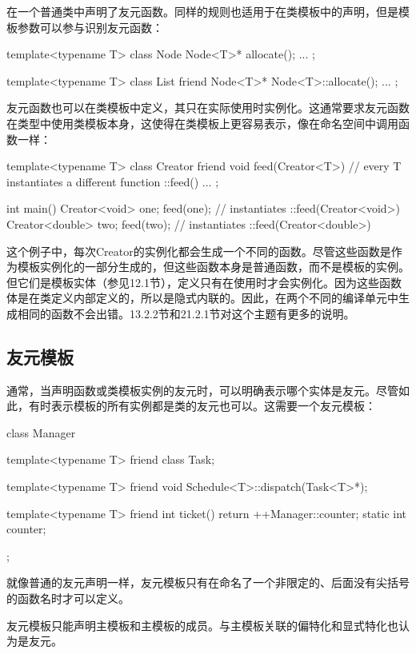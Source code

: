 在一个普通类中声明了友元函数。同样的规则也适用于在类模板中的声明，但是模板参数可以参与识别友元函数：

\begin{cpp}
template<typename T>
class Node {
	Node<T>* allocate();
	...
};

template<typename T>
class List {
	friend Node<T>* Node<T>::allocate();
	...
};
\end{cpp}

友元函数也可以在类模板中定义，其只在实际使用时实例化。这通常要求友元函数在类型中使用类模板本身，这使得在类模板上更容易表示，像在命名空间中调用函数一样：

\begin{cpp}
template<typename T>
class Creator {
	friend void feed(Creator<T>) { // every T instantiates a different function ::feed()
		...
	}
};

int main() {
	Creator<void> one;
	feed(one); // instantiates ::feed(Creator<void>)
	Creator<double> two;
	feed(two); // instantiates ::feed(Creator<double>)
}
\end{cpp}

这个例子中，每次Creator的实例化都会生成一个不同的函数。尽管这些函数是作为模板实例化的一部分生成的，但这些函数本身是普通函数，而不是模板的实例。但它们是模板实体（参见12.1节），定义只有在使用时才会实例化。因为这些函数体是在类定义内部定义的，所以是隐式内联的。因此，在两个不同的编译单元中生成相同的函数不会出错。13.2.2节和21.2.1节对这个主题有更多的说明。

\subsection{友元模板}

通常，当声明函数或类模板实例的友元时，可以明确表示哪个实体是友元。尽管如此，有时表示模板的所有实例都是类的友元也可以。这需要一个友元模板：

\begin{cpp}
class Manager {
	template<typename T>
	friend class Task;
	
	template<typename T>
	friend void Schedule<T>::dispatch(Task<T>*);
	
	template<typename T>
		friend int ticket() {
			return ++Manager::counter;
		}
	static int counter;
};
\end{cpp}

就像普通的友元声明一样，友元模板只有在命名了一个非限定的、后面没有尖括号的函数名时才可以定义。

友元模板只能声明主模板和主模板的成员。与主模板关联的偏特化和显式特化也认为是友元。








